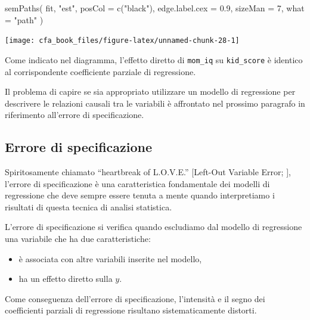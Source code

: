 \documentclass[
  11pt,
]{krantz}
\makeatletter
\newenvironment{Shaded}{\begin{snugshade}}{\end{snugshade}}
\newcommand{\AttributeTok}[1]{\textcolor[rgb]{0.61,0.61,0.61}{#1}}
\newcommand{\DecValTok}[1]{\textcolor[rgb]{0.06,0.06,0.06}{#1}}
\newcommand{\FloatTok}[1]{\textcolor[rgb]{0.06,0.06,0.06}{#1}}
\newcommand{\FunctionTok}[1]{\textcolor[rgb]{0,0,0}{#1}}
\newcommand{\NormalTok}[1]{#1}
\newcommand{\StringTok}[1]{\textcolor[rgb]{0.5,0.5,0.5}{#1}}
\providecommand{\tightlist}{%
  \setlength{\itemsep}{0pt}\setlength{\parskip}{0pt}}
\newenvironment{kframe}{%
\medskip{}
\setlength{\fboxsep}{.8em}
 \def\at@end@of@kframe{}%
 \ifinner\ifhmode%
  \def\at@end@of@kframe{\end{minipage}}%
  \begin{minipage}{\columnwidth}%
 \fi\fi%
 \def\FrameCommand##1{\hskip\@totalleftmargin \hskip-\fboxsep
 \colorbox{shadecolor}{##1}\hskip-\fboxsep
     \hskip-\linewidth \hskip-\@totalleftmargin \hskip\columnwidth}%
 \MakeFramed {\advance\hsize-\width
   \@totalleftmargin\z@ \linewidth\hsize
   \@setminipage}}%
 {\par\unskip\endMakeFramed%
 \at@end@of@kframe}
\renewenvironment{Shaded}{\begin{kframe}}{\end{kframe}}
\theoremstyle{definition}
\theoremstyle{definition}
\theoremstyle{definition}
\theoremstyle{definition}
\theoremstyle{remark}
\makeatother
\begin{document}
\begin{Shaded}
\begin{Highlighting}[]
\FunctionTok{semPaths}\NormalTok{(}
\NormalTok{  fit, }\StringTok{"est"}\NormalTok{,}
  \AttributeTok{posCol =} \FunctionTok{c}\NormalTok{(}\StringTok{"black"}\NormalTok{),}
  \AttributeTok{edge.label.cex =} \FloatTok{0.9}\NormalTok{,}
  \AttributeTok{sizeMan =} \DecValTok{7}\NormalTok{,}
  \AttributeTok{what =} \StringTok{"path"}
\NormalTok{)}
\end{Highlighting}
\end{Shaded}

\begin{center}\texttt{[image: cfa\_book\_files/figure-latex/unnamed-chunk-28-1]} \end{center}

Come indicato nel diagramma, l'effetto diretto di \texttt{mom\_iq} su \texttt{kid\_score} è identico al corrispondente coefficiente parziale di regressione.

Il problema di capire se sia appropriato utilizzare un modello di regressione per descrivere le relazioni causali tra le variabili è affrontato nel prossimo paragrafo in riferimento all'errore di specificazione.

\hypertarget{errore-di-specificazione}{%
\subsection{Errore di specificazione}\label{errore-di-specificazione}}

Spiritosamente chiamato ``heartbreak of L.O.V.E.'' {[}Left-Out Variable Error; \citet{mauro1990understanding}{]}, l'errore di specificazione è una caratteristica fondamentale dei modelli di regressione che deve sempre essere tenuta a mente quando interpretiamo i risultati di questa tecnica di analisi statistica.

L'errore di specificazione si verifica quando escludiamo dal modello di regressione una variabile che ha due caratteristiche:

\begin{itemize}
\tightlist
\item
  è associata con altre variabili inserite nel modello,
\item
  ha un effetto diretto sulla \(y\).
\end{itemize}

Come conseguenza dell'errore di specificazione, l'intensità e il segno dei coefficienti parziali di regressione risultano sistematicamente distorti.
\end{document}
